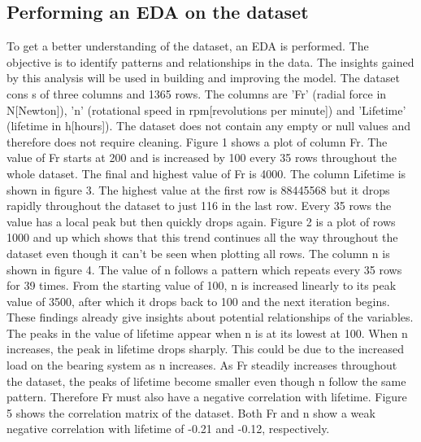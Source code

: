 \documentclass[letterpaper,10pt]{article}
\begin{document}
	\subsection{Performing an EDA on the dataset}
	To get a better understanding of the dataset, an EDA is performed. The objective is to identify patterns and relationships in the data. The insights gained by this analysis will be used in building and improving the model.
	\newline The dataset cons s of three columns and 1365 rows. The columns are 'Fr' (radial force in N[Newton]), 'n' (rotational speed in rpm[revolutions per minute]) and 'Lifetime' (lifetime in h[hours]). The dataset does not contain any empty or null values and therefore does not require cleaning.
	\newline Figure 1 shows a plot of column Fr. The value of Fr starts at 200 and is increased by 100 every 35 rows throughout the whole dataset. The final and highest value of Fr is 4000. 
	\newline The column Lifetime is shown in figure 3. The highest value at the first row is 88445568 but it drops rapidly throughout the dataset to just 116 in the last row. Every 35 rows the value has a local peak but then quickly drops again. Figure 2 is a plot of rows 1000 and up which shows that this trend continues all the way throughout the dataset even though it can't be seen when plotting all rows. 
	\newline The column n is shown in figure 4. The value of n follows a pattern which repeats every 35 rows for 39 times. From the starting value of 100, n is  increased linearly to its peak value of 3500, after which it drops back to 100 and the next iteration begins. 
	\newline These findings already give insights about potential relationships of the variables. The peaks in the value of lifetime appear when n is at its lowest at 100. When n increases, the peak in lifetime drops sharply. This could be due to the increased load on the bearing system as n increases. As Fr steadily increases throughout the dataset, the peaks of lifetime become smaller even though n follow the same pattern. Therefore Fr must also have a negative correlation with lifetime.
	\newline Figure 5 shows the correlation matrix of the dataset. Both Fr and n show a weak negative correlation with lifetime of -0.21 and -0.12, respectively. 
	
\end{document}
